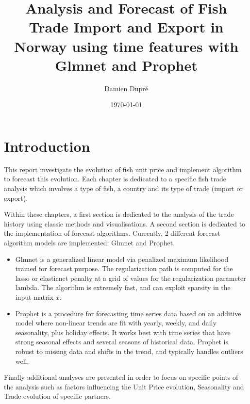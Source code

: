 \documentclass[10,a4paperpaper,]{article}
\title{Analysis and Forecast of Fish Trade Import and Export \break in Norway
using time features with Glmnet and Prophet}
\author{Damien Dupré}
\date{\today}
\begin{document}
\renewcommand{\contentsname}{Analysis and Forecast of Fish Trade Import and Export in Norway}

\renewcommand{\pagename}{Page}


\maketitle
\tableofcontents
{}
\clearpage
\justifying

\section{Introduction}

This report investigate the evolution of fish unit price and implement
algorithm to forecast this evolution. Each chapter is dedicated to a
specific fish trade analysis which involves a type of fish, a country
and its type of trade (import or export).

Within these chapters, a first section is dedicated to the analysis of
the trade history using classic methods and visualisations. A second
section is dedicated to the implementation of forecast algorithms.
Currently, 2 different forecast algorithm models are implemented: Glmnet
and Prophet.

\begin{itemize}
\item
  Glmnet is a generalized linear model via penalized maximum likelihood
  trained for forecast purpose. The regularization path is computed for
  the lasso or elasticnet penalty at a grid of values for the
  regularization parameter lambda. The algorithm is extremely fast, and
  can exploit sparsity in the input matrix \(x\).
\item
  Prophet is a procedure for forecasting time series data based on an
  additive model where non-linear trends are fit with yearly, weekly,
  and daily seasonality, plus holiday effects. It works best with time
  series that have strong seasonal effects and several seasons of
  historical data. Prophet is robust to missing data and shifts in the
  trend, and typically handles outliers well.
\end{itemize}

Finally additional analyses are presented in order to focus on specific
points of the analysis such as factors influencing the Unit Price
evolution, Seasonality and Trade evolution of specific partners.

\clearpage
\end{document}
